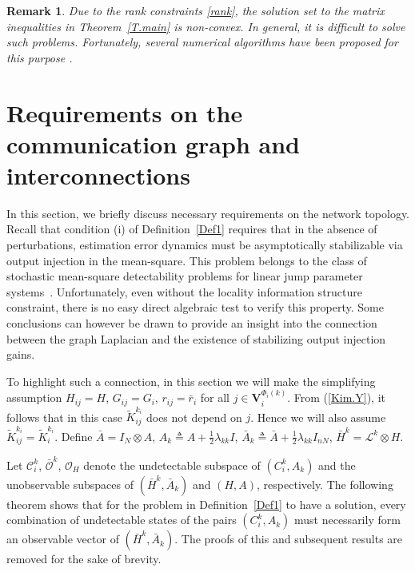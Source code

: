 \documentclass[a4paper,twocolumn]{autart}
\newtheorem{remark}{Remark}
\begin{document}
\begin{remark}
  Due to the rank constraints \eqref{rank}, the solution set to the matrix
  inequalities in Theorem~\ref{T.main} is non-convex. In general, it is
  difficult to solve such problems. Fortunately, several numerical
  algorithms have been proposed for this purpose
\cite{EOA-1997,OHM-2006}.
\end{remark}

\section{Requirements on the communication graph and
  interconnections}\label{requirements}

In this section, we briefly discuss necessary requirements on the network topology. Recall that condition (i) of Definition~\ref{Def1} requires
that in the absence of perturbations, estimation error dynamics must be
asymptotically stabilizable via output injection in the mean-square.   
This problem belongs to the class of stochastic mean-square detectability
problems for linear jump parameter systems~\cite{CdV-2002}. 
Unfortunately, even without the locality information structure constraint,
there is no easy  direct
algebraic test to verify this property. Some conclusions
can however be drawn to provide an insight
into the connection between the graph Laplacian and the existence of
stabilizing output injection gains. 

To highlight such a connection, in this section we
will make the simplifying assumption $H_{ij}=H$, $G_{ij}=G_i$, $r_{ij}=\bar
r_i$ for all $j\in
\mathbf{V}_i^{\Phi_i(k)}$. From (\ref{Kim.Y}), it follows that in this case
$\tilde K_{ij}^{k_i}$ does not depend on $j$. Hence
we will also assume 
$\tilde K_{ij}^{k_i}=\tilde K_i^{k_i}$. Define
$\bar A=I_N\otimes A$, $A_k\triangleq A+\frac{1}{2}\lambda_{kk}I$, 
$\bar A_k\triangleq \bar A+\frac{1}{2}\lambda_{kk}I_{nN}$, $\bar
H^k=\mathcal{L}^k\otimes H$. 

Let $\mathcal{C}_i^k$, $\bar{\mathcal{O}}^k$, $\mathcal{O}_H$ denote the 
undetectable subspace of $(C_i^k, A_k)$ and the unobservable subspaces of
$(\bar H^k, \bar A_k)$ and $(H, A)$, respectively. The following theorem shows that for the problem in
Definition~\ref{Def1} to have a solution, every combination of undetectable
states of the pairs $(C_i^k, A_k)$ must necessarily form an observable
vector of $(\bar H^k, \bar A_k)$. 
The proofs of this and subsequent results are removed for the sake of brevity.
\end{document}
